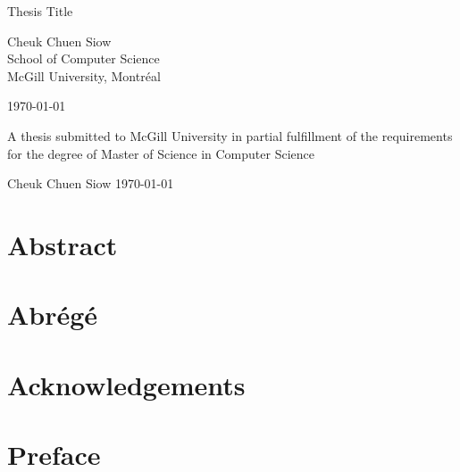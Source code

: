 \documentclass[12pt,letterpaper]{report}
\begin{document}
\begin{titlepage}
	\begin{center}
		\vspace*{1in}
		
		\Huge
		Thesis Title
		
		\vfill
		
		\large
		Cheuk Chuen Siow\\
		School of Computer Science\\
		McGill University, Montréal
		
		\vfill
		
		\monthyeardate\today
		
		\vfill
		
		A thesis submitted to McGill University in partial fulfillment of the requirements for the degree of Master of Science in Computer Science
		
		\vfill
		
		\textcopyright{} Cheuk Chuen Siow \yeardate\today
		
		\vspace*{1in}
	\end{center}
\end{titlepage}

\clearpage
{}
\setcounter{page}{2}

\chapter*{Abstract}



\clearpage

\chapter*{Abrégé}



\clearpage

\chapter*{Acknowledgements}



\clearpage

\chapter*{Preface}
\end{document}
